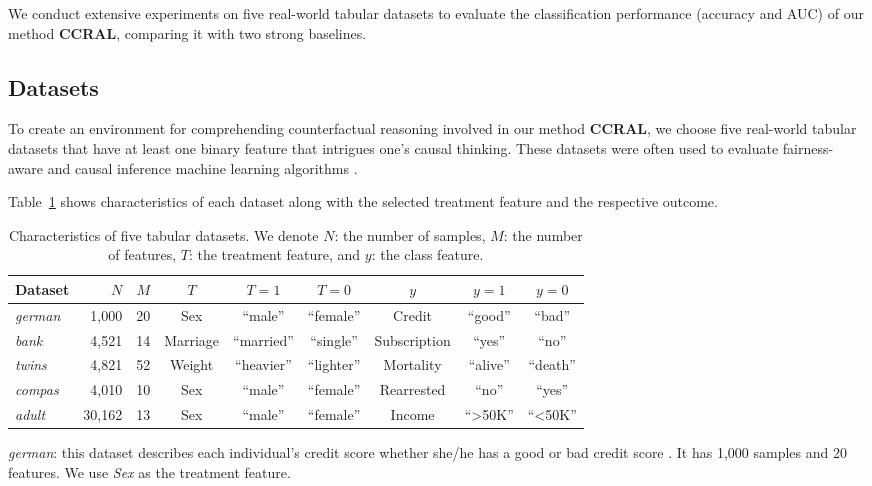We conduct extensive experiments on five real-world tabular datasets
to evaluate the classification performance (accuracy and AUC) of our
method \textbf{CCRAL}, comparing it with two strong baselines.

\subsection{Datasets}

To create an environment for comprehending counterfactual reasoning
involved in our method \textbf{CCRAL}, we choose five real-world tabular
datasets that have at least one binary feature that intrigues one's
causal thinking. These datasets were often used to evaluate fairness-aware
and causal inference machine learning algorithms \cite{friedler2019comparative,zafar2017parity,nguyen2021fairness}.

Table~\ref{tab:Characteristics-of-datasets} shows characteristics
of each dataset along with the selected treatment feature and the
respective outcome.

\begin{table}
\caption{\label{tab:Characteristics-of-datasets}Characteristics of five tabular
datasets. We denote $N$: the number of samples, $M$: the number
of features, $T$: the treatment feature, and $y$: the class feature.}

\centering{}%
\begin{tabular}{|l|r|r|c|c|c|c|c|c|}
\hline 
\textbf{Dataset} & \textbf{$N$} & \textbf{$M$} & $T$ & \textbf{$T=1$} & \textbf{$T=0$} & \textbf{$y$} & \textbf{$y=1$} & \textbf{$y=0$}\tabularnewline
\hline 
\hline 
\textit{german} & 1,000 & 20 & Sex & ``male'' & ``female'' & Credit & ``good'' & ``bad''\tabularnewline
\hline 
\textit{bank} & 4,521 & 14 & Marriage & ``married'' & ``single'' & Subscription & ``yes'' & ``no''\tabularnewline
\hline 
\textit{twins} & 4,821 & 52 & Weight & ``heavier'' & ``lighter'' & Mortality & ``alive'' & ``death''\tabularnewline
\hline 
\textit{compas} & 4,010 & 10 & Sex & ``male'' & ``female'' & Rearrested & ``no'' & ``yes''\tabularnewline
\hline 
\textit{adult} & 30,162 & 13 & Sex & ``male'' & ``female'' & Income & ``\textgreater 50K'' & ``\textless 50K''\tabularnewline
\hline 
\end{tabular}
\end{table}
\textit{german}: this dataset describes each individual's credit score
whether she/he has a good or bad credit score \cite{dua_graff_19_uci}.
It has 1,000 samples and 20 features. We use \textit{Sex} as the treatment
feature.

